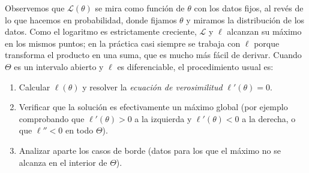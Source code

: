 \documentclass[12pt]{amsart}
\theoremstyle{definition}
\newcommand{\calL}{\ensuremath{\mathcal{L}}}
\begin{document}
Observemos que $\calL(\theta)$ se mira como función de $\theta$ con los datos fijos, al revés de lo que hacemos en probabilidad, donde fijamos $\theta$ y miramos la distribución de los datos. Como el logaritmo es estrictamente creciente, $\calL$ y $\ell$ alcanzan su máximo en los mismos puntos; en la práctica casi siempre se trabaja con $\ell$ porque transforma el producto en una suma, que es mucho más fácil de derivar. Cuando $\Theta$ es un intervalo abierto y $\ell$ es diferenciable, el procedimiento usual es:
\begin{enumerate}
    \item Calcular $\ell(\theta)$ y resolver la \emph{ecuación de verosimilitud} $\ell'(\theta)=0$.
    \item Verificar que la solución es efectivamente un máximo global (por ejemplo comprobando que $\ell'(\theta)>0$ a la izquierda y $\ell'(\theta)<0$ a la derecha, o que $\ell''<0$ en todo $\Theta$).
    \item Analizar aparte los casos de borde (datos para los que el máximo no se alcanza en el interior de $\Theta$).
\end{enumerate}
\end{document}
